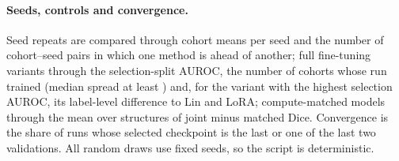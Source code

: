 \paragraph{Seeds, controls and convergence.} Seed repeats are compared through cohort means per seed and the number of cohort--seed pairs in which one method is ahead of another; full fine-tuning variants through the selection-split AUROC, the number of cohorts whose run trained (median spread at least \numSpreadMinValue{}) and, for the variant with the highest selection AUROC, its label-level difference to Lin and LoRA; compute-matched models through the mean over structures of joint minus matched Dice. Convergence is the share of runs whose selected checkpoint is the last or one of the last two validations. All random draws use fixed seeds, so the script is deterministic.
